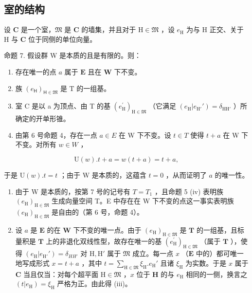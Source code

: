 \subsection{室的结构}

设 \(\mathbf{C}\) 是一个室，\(\mathfrak{M}\) 是 \(\mathbf{C}\) 的墙集，并且对于 \(\mathrm{H} \in \mathfrak{M}\) ，设 \(e_{\mathrm{H}}\) 为与 \(\mathrm{H}\) 正交、关于 \(\mathrm{H}\) 与 \(\mathbf{C}\) 位于同侧的单位向量。

命题 7. 假设群 W 是本质的且是有限的。则：

\begin{enumerate}
\def\labelenumi{(\roman{enumi})}
\item
  存在唯一的点 \(a\) 属于 \(\mathbf{E}\) 且在 \(\mathbf{W}\) 下不变。
\item
  族 \((e_{\mathsf{H}})_{\mathsf{H}\in \mathfrak{M}}\) 是 \(\mathrm{T}\) 的一组基。
\item
  室 C 是以 a 为顶点、由 T 的基 \((e_{\mathrm{H}}^{\prime})_{\mathrm{H}\in \mathfrak{M}}\) （它满足 \((e_{\mathrm{H}}|e_{\mathrm{H}'}') = \delta_{\mathrm{HH}'}\) ）所确定的开单形锥。
\item
  由第 6 号命题 4，存在一点 \(a \in E\) 在 W 下不变。设 \(t \in T\) 使得 \(t + a\) 在 W 下不变。对所有 \(w \in W\) ，
\end{enumerate}

\[
\mathrm{U} (w). t + a = w (t + a) = t + a,
\]

于是 \(\mathrm{U}(w).t = t\) ；由于 \(\mathrm{W}\) 是本质的，这蕴含 \(t = 0\) ，从而证明了 \(a\) 的唯一性。

\begin{enumerate}
\def\labelenumi{(\roman{enumi})}
\setcounter{enumi}{1}
\item
  由于 W 是本质的，按第 7 号的记号有 \(T = T_{1}\) ，且命题 5 (iv) 表明族 \((e_{\mathrm{H}})_{\mathrm{H}\in\mathfrak{M}}\) 生成向量空间 T。E 中存在在 W 下不变的点这一事实表明族 \((e_{\mathrm{H}})_{\mathrm{H}\in\mathfrak{M}}\) 是自由的（第 6 号，命题 4）。
\item
  设 \(a\) 是 \(\mathbf{E}\) 的在 \(\mathbf{W}\) 下不变的唯一点。由于 \((e_{\mathrm{H}})_{\mathrm{H}\in \mathfrak{M}}\) 是 \(\mathbf{T}\) 的一组基，且标量积是 \(\mathbf{T}\) 上的非退化双线性型，故存在唯一的基 \((e_{\mathrm{H}}^{\prime})_{\mathrm{H}\in \mathfrak{M}}\) （属于 \(\mathbf{T}\) ），使得 \((e_{\mathrm{H}}|e_{\mathrm{H}'}') = \delta_{HH'}\) 对 \(\mathrm{H},\mathrm{H}'\) 属于 \(\mathfrak{M}\) 成立。每一点 \(x\) （\(\mathbf{E}\) 中的）都可唯一地写成形式 \(x = t + a\) ，其中 \(t = \sum_{\mathrm{H}\in \mathfrak{M}}\xi_{\mathrm{H}}.e_{\mathrm{H}}'\) 且诸 \(\xi_{\mathrm{H}}\) 为实数。于是 \(x\) 属于 \(\mathbf{C}\) 当且仅当：对每个超平面 \(\mathrm{H}\in \mathfrak{M}\) ，\(x\) 位于 \(\mathbf{H}\) 的与 \(e_{\mathrm{H}}\) 相同的一侧，换言之 \((t|e_{\mathrm{H}}) = \xi_{\mathrm{H}}\) 严格为正。由此得 (iii)。
\end{enumerate}

